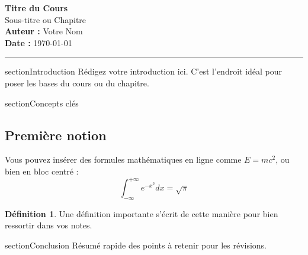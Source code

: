 \documentclass[11pt, a4paper]{article}
\theoremstyle{definition}
\newtheorem{defn}{Définition}[section]
\begin{document}
\begin{center}
    {\huge \textbf{Titre du Cours}} \\[0.5cm]
    {\large Sous-titre ou Chapitre} \\[0.5cm]
    \vspace{0.3cm}
    \textbf{Auteur :} Votre Nom \\
    \textbf{Date :} \today
\end{center}

\hrule
\vspace{1cm}

\tableofcontents
\newpage

section{Introduction}
Rédigez votre introduction ici. C'est l'endroit idéal pour poser les bases du cours ou du chapitre.

section{Concepts clés}

\subsection{Première notion}
Vous pouvez insérer des formules mathématiques en ligne comme $E = mc^2$, ou bien en bloc centré :
$$
\int_{-\infty}^{+\infty} e^{-x^2} dx = \sqrt{\pi}
$$

\begin{defn}
    Une définition importante s'écrit de cette manière pour bien ressortir dans vos notes.
\end{defn}

section{Conclusion}
Résumé rapide des points à retenir pour les révisions.
\end{document}
